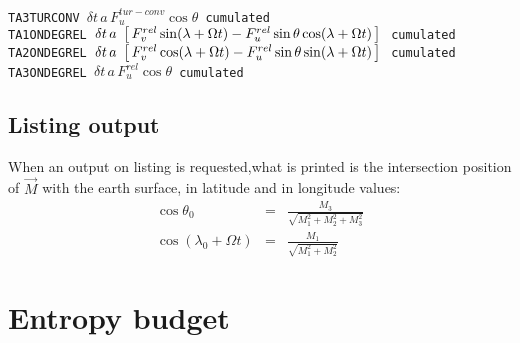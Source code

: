 \begin{tabbing}
        \tt TA3TURCONV          \> $\delta t \, a \, F_{u}^{tur-conv}\cos\theta$ \> cumulated\\ [1ex]
        \tt TA1ONDEGREL         \> $\delta t \, a \, \, \left[ \, F_{v}^{rel}\sin(\lambda+\Omega t)-F_{u}^{rel}\sin\theta\cos(\lambda+\Omega t)\, \right] \,$ \> cumulated\\ [1ex]
        \tt TA2ONDEGREL         \> $\delta t \, a \, \, \left[ \, F_{v}^{rel}\cos(\lambda+\Omega t)-F_{u}^{rel}\sin\theta\sin(\lambda+\Omega t)\, \right] \,$ \> cumulated\\ [1ex]
        \tt TA3ONDEGREL         \> $\delta t \, a \, F_{u}^{rel}\cos\theta$ \> cumulated\\ [1ex]
\end{tabbing}
\subsection*{Listing output}
When an output on listing is requested,what is printed is the intersection position of $\vec{M}$ with the earth surface, in latitude and in longitude values: 
\begin{eqnarray*}
        \cos \theta_0 & = & \frac{M_3}{\sqrt{M^2_1 + M^2_2 + M^2_3}} \\
        \cos (\lambda_0 + \Omega t) & = & \frac{M_1}{\sqrt{M^2_1 + M^2_2}}
\end{eqnarray*}

\section{Entropy budget}
